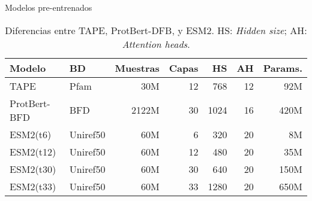\documentclass[10pt]{beamer}
\newcommand{\1}{
	\setbeamertemplate{background}{
		\texttt{[image: img/1]}
		\tikz[overlay] \fill[fill opacity=0.75,fill=white] (0,0) rectangle (-\paperwidth,\paperheight);
	}
}
\begin{document}
\begin{frame}{Modelos pre-entrenados}{}
	
	\begin{table}
		\centering
		\caption{Diferencias entre TAPE, ProtBert-DFB, y ESM2. HS: \textit{Hidden size}; AH: \textit{Attention heads}.}
		\label{tab:pretrained}%
		\setlength{\tabcolsep}{0.5em} %
		{\renewcommand{\arraystretch}{1.5}%
			\footnotesize
			\begin{tabular}{llrrrrr}
				
				\textbf{Modelo}   & \textbf{BD} & \textbf{Muestras} & \textbf{Capas} & \textbf{HS} & \textbf{AH} & \textbf{Params.} \\
				\hline
				TAPE             & Pfam             & 30M                   & 12              & 768                  & 12                       & 92M                 \\
				ProtBert-BFD     & BFD              & 2122M                 & 30              & 1024                 & 16                       & 420M                \\
				ESM2(t6)  & Uniref50         & 60M                   & 6               & 320                  & 20                       & 8M                  \\
				ESM2(t12)  & Uniref50         & 60M                   & 12              & 480                  & 20                       & 35M                 \\
				ESM2(t30) & Uniref50         & 60M                   & 30              & 640                  & 20                       & 150M                \\
				ESM2(t33)  & Uniref50         & 60M                   & 33              & 1280                 & 20                       & 650M               \\
				
		\end{tabular}}
		
	\end{table}
	
\end{frame}


\end{document}
